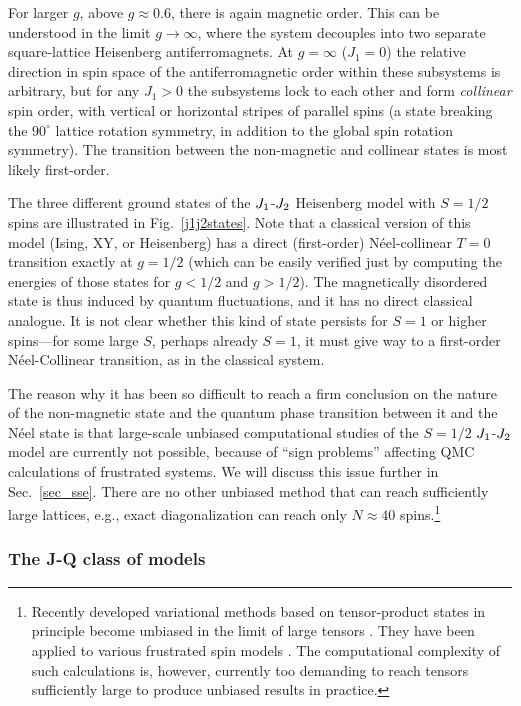 \documentclass[draft,numberedheadings]{aipproc}
\begin{document}
For larger $g$, above $g \approx 0.6$, there is again magnetic order. This can be understood in the limit $g \to \infty$, where the system decouples into two separate
square-lattice Heisenberg antiferromagnets. At $g=\infty$ ($J_1=0$) the relative direction in spin space of the antiferromagnetic order within these subsystems is 
arbitrary, but for any $J_1>0$ the subsystems lock to each other and form {\it  collinear} spin order, with vertical or horizontal stripes of parallel spins (a state
breaking the $90^\circ$ lattice rotation symmetry, in addition to the global spin rotation symmetry). The transition between the non-magnetic and collinear states 
is most likely first-order.

The three different ground states of the  $J_{\rm 1}$-$J_{\rm 2}$ Heisenberg model with $S=1/2$ spins are illustrated in Fig.~\ref{j1j2states}. Note that a 
classical version of this model (Ising, XY, or Heisenberg) has a direct (first-order) N\'eel-collinear $T=0$ transition exactly at $g=1/2$ (which can be easily 
verified just by computing the energies of those states for $g<1/2$ and $g>1/2$). The magnetically disordered state is thus induced by quantum fluctuations, and 
it has no direct classical analogue. It is not clear whether this kind of state persists for $S=1$ or higher spins---for some large $S$, perhaps already $S=1$, 
it must give way to a first-order N\'eel-Collinear transition, as in the classical system.

The reason why it has been so difficult to reach a firm conclusion on the nature of the non-magnetic state and the quantum phase transition between it and
the N\'eel state is that large-scale unbiased computational studies of the $S=1/2$ $J_{\rm 1}$-$J_{\rm 2}$ model  are currently not possible, because of 
``sign problems'' affecting QMC calculations of frustrated systems. We will discuss this issue further in Sec.~\ref{sec_sse}. There are no other unbiased 
method that can reach sufficiently large lattices, e.g., exact diagonalization can reach only $N \approx 40$ spins.\footnote{Recently developed variational 
methods based on tensor-product states in principle become unbiased in the limit of large tensors \cite{verstraete1}. They have been applied to various 
frustrated spin models \cite{murg1}. The computational complexity of such calculations is, however, currently too demanding to reach tensors sufficiently 
large to produce unbiased results in practice.}

\subsubsection{The J-Q class of models}
\label{jqmodelintro}
\end{document}
